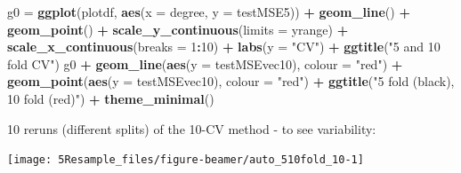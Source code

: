 \documentclass[10pt,ignorenonframetext,]{beamer}
\newenvironment{Shaded}{\begin{snugshade}}{\end{snugshade}}
\newcommand{\KeywordTok}[1]{\textcolor[rgb]{0.13,0.29,0.53}{\textbf{#1}}}
\newcommand{\DataTypeTok}[1]{\textcolor[rgb]{0.13,0.29,0.53}{#1}}
\newcommand{\DecValTok}[1]{\textcolor[rgb]{0.00,0.00,0.81}{#1}}
\newcommand{\StringTok}[1]{\textcolor[rgb]{0.31,0.60,0.02}{#1}}
\newcommand{\OperatorTok}[1]{\textcolor[rgb]{0.81,0.36,0.00}{\textbf{#1}}}
\newcommand{\NormalTok}[1]{#1}
\begin{document}
\begin{frame}[fragile]
\begin{Shaded}
\begin{Highlighting}[]
\NormalTok{g0 =}\StringTok{ }\KeywordTok{ggplot}\NormalTok{(plotdf, }\KeywordTok{aes}\NormalTok{(}\DataTypeTok{x =}\NormalTok{ degree, }\DataTypeTok{y =}\NormalTok{ testMSE5)) }\OperatorTok{+}\StringTok{ }\KeywordTok{geom_line}\NormalTok{() }\OperatorTok{+}\StringTok{ }\KeywordTok{geom_point}\NormalTok{() }\OperatorTok{+}\StringTok{ }
\StringTok{    }\KeywordTok{scale_y_continuous}\NormalTok{(}\DataTypeTok{limits =}\NormalTok{ yrange) }\OperatorTok{+}\StringTok{ }\KeywordTok{scale_x_continuous}\NormalTok{(}\DataTypeTok{breaks =} \DecValTok{1}\OperatorTok{:}\DecValTok{10}\NormalTok{) }\OperatorTok{+}\StringTok{ }
\StringTok{    }\KeywordTok{labs}\NormalTok{(}\DataTypeTok{y =} \StringTok{"CV"}\NormalTok{) }\OperatorTok{+}\StringTok{ }\KeywordTok{ggtitle}\NormalTok{(}\StringTok{"5 and 10 fold CV"}\NormalTok{)}
\NormalTok{g0 }\OperatorTok{+}\StringTok{ }\KeywordTok{geom_line}\NormalTok{(}\KeywordTok{aes}\NormalTok{(}\DataTypeTok{y =}\NormalTok{ testMSEvec10), }\DataTypeTok{colour =} \StringTok{"red"}\NormalTok{) }\OperatorTok{+}\StringTok{ }\KeywordTok{geom_point}\NormalTok{(}\KeywordTok{aes}\NormalTok{(}\DataTypeTok{y =}\NormalTok{ testMSEvec10), }
    \DataTypeTok{colour =} \StringTok{"red"}\NormalTok{) }\OperatorTok{+}\StringTok{ }\KeywordTok{ggtitle}\NormalTok{(}\StringTok{"5 fold (black), 10 fold (red)"}\NormalTok{) }\OperatorTok{+}\StringTok{ }\KeywordTok{theme_minimal}\NormalTok{()}
\end{Highlighting}
\end{Shaded}

\normalsize

\end{frame}

\begin{frame}

10 reruns (different splits) of the 10-CV method - to see variability:

\begin{center}\texttt{[image: 5Resample\_files/figure-beamer/auto\_510fold\_10-1]} \end{center}

\end{frame}
\end{document}
